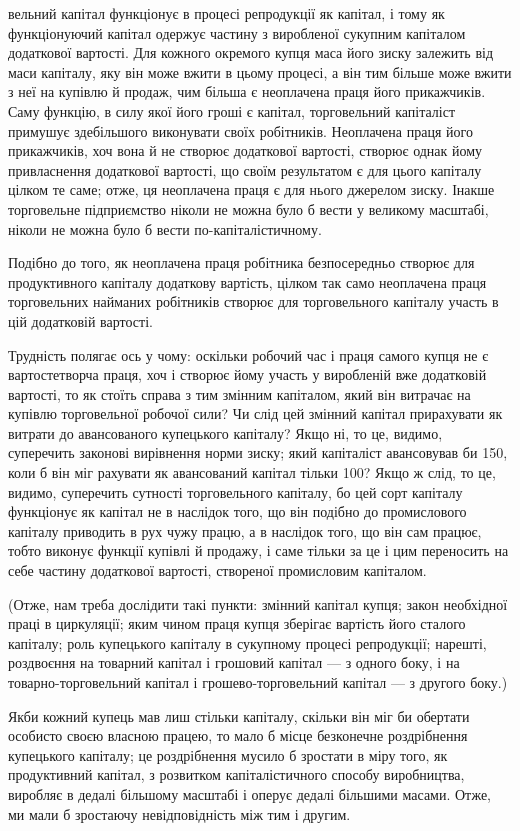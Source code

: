 вельний капітал функціонує в процесі репродукції як капітал,
і тому як функціонуючий капітал одержує частину з виробленої
сукупним капіталом додаткової вартості. Для кожного окремого
купця маса його зиску залежить від маси капіталу, яку він
може вжити в цьому процесі, а він тим більше може вжити
з неї на купівлю й продаж, чим більша є неоплачена праця його
прикажчиків. Саму функцію, в силу якої його гроші є капітал,
торговельний капіталіст примушує здебільшого виконувати своїх
робітників. Неоплачена праця його прикажчиків, хоч вона й не
створює додаткової вартості, створює однак йому привласнення
додаткової вартості, що своїм результатом є для цього капіталу
цілком те саме; отже, ця неоплачена праця є для нього
джерелом зиску. Інакше торговельне підприємство ніколи не
можна було б вести у великому масштабі, ніколи не можна
було б вести по-капіталістичному.

Подібно до того, як неоплачена праця робітника безпосередньо
створює для продуктивного капіталу додаткову вартість, цілком
так само неоплачена праця торговельних найманих робітників створює
для торговельного капіталу участь в цій додатковій вартості.

Трудність полягає ось у чому: оскільки робочий час і праця
самого купця не є вартостетворча праця, хоч і створює йому
участь у виробленій вже додатковій вартості, то як стоїть справа
з тим змінним капіталом, який він витрачає на купівлю торговельної
робочої сили? Чи слід цей змінний капітал прирахувати
як витрати до авансованого купецького капіталу? Якщо ні, то це,
видимо, суперечить законові вирівнення норми зиску; який капіталіст
авансовував би 150, коли б він міг рахувати як авансований
капітал тільки 100? Якщо ж слід, то це, видимо, суперечить
сутності торговельного капіталу, бо цей сорт капіталу
функціонує як капітал не в наслідок того, що він подібно до
промислового капіталу приводить в рух чужу працю, а в наслідок
того, що він сам працює, тобто виконує функції купівлі й продажу,
і саме тільки за це і цим переносить на себе частину
додаткової вартості, створеної промисловим капіталом.

(Отже, нам треба дослідити такі пункти: змінний капітал купця;
закон необхідної праці в циркуляції; яким чином праця купця
зберігає вартість його сталого капіталу; роль купецького капіталу
в сукупному процесі репродукції; нарешті, роздвоєння на
товарний капітал і грошовий капітал — з одного боку, і на товарно-торговельний
капітал і грошево-торговельний капітал —
з другого боку.)

Якби кожний купець мав лиш стільки капіталу, скільки він
міг би обертати особисто своєю власною працею, то мало б
місце безконечне роздрібнення купецького капіталу; це роздрібнення
мусило б зростати в міру того, як продуктивний капітал,
з розвитком капіталістичного способу виробництва, виробляє
в дедалі більшому масштабі і оперує дедалі більшими масами.
Отже, ми мали б зростаючу невідповідність між тим і другим.
